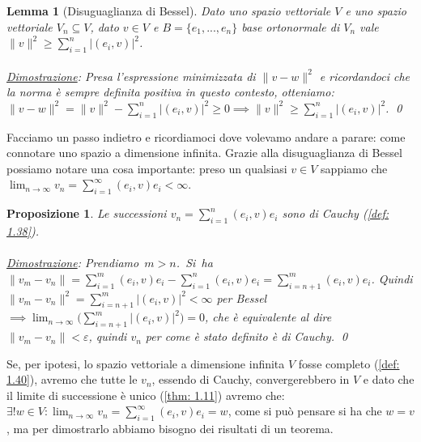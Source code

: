 \documentclass[a4paper,12pt]{report}
\newtheorem{proposizione}{Proposizione}[chapter]
\newtheorem{lemma}{Lemma}[chapter]
\newcommand{\lt}{<}
\newcommand{\gt}{>}
\begin{document}
\begin{lemma}[Disuguaglianza di Bessel]\label{lem: 2.2}
    Dato uno spazio vettoriale $V$ e uno spazio vettoriale $V_n \subseteq V$, dato $v\in V$ e $B=\{e_1,...,e_n\}$ base ortonormale di $V_n$ vale 
    \\$\|v\|^2\geq\displaystyle\sum_{i=1}^n|(e_i,v)|^2$.
    \\
    \\ \underline{Dimostrazione}: Presa l'espressione minimizzata di $\|v-w\|^2$ e ricordandoci che la norma è sempre definita positiva in questo contesto, otteniamo:
    \\$\|v-w\|^2=\|v\|^2-\displaystyle\sum_{i=1}^n|(e_i,v)|^2 \geq0 \implies \|v\|^2\geq\displaystyle\sum_{i=1}^n|(e_i,v)|^2$. \qed
\end{lemma}

Facciamo un passo indietro e ricordiamoci dove volevamo andare a parare: come connotare uno spazio a dimensione infinita. Grazie alla disuguaglianza di Bessel possiamo notare una cosa importante: preso un qualsiasi $v \in V$ sappiamo che $\displaystyle\lim_{n \to \infty}v_n=\sum_{i=1}^{\infty}(e_i,v)e_i \lt \infty$. 

\vspace{0.3cm}

\begin{proposizione}
    Le successioni $v_n=\displaystyle\sum_{i=1}^n(e_i,v)e_i$ sono di Cauchy (\ref{def: 1.38}).
    \\
    \\ \underline{Dimostrazione}: \mbox{Prendiamo $m \gt n$. Si ha $\|v_m-v_n\|=\displaystyle\sum_{i=1}^m(e_i,v)e_i-\sum_{i=1}^n(e_i,v)e_i=\sum_{i=n+1}^m(e_i,v)e_i$}.
    Quindi $\|v_m-v_n\|^2=\displaystyle\sum_{i=n+1}^m|(e_i,v)|^2 \lt \infty$ per Bessel $\implies \displaystyle\lim_{n \to \infty}\bigg(\sum_{i=n+1}^m|(e_i,v)|^2\bigg)=0$, che è equivalente al dire $\|v_m-v_n\| \lt \varepsilon$, quindi $v_n$ per come è stato definito è di Cauchy. \qed
\end{proposizione}

\vspace{0.5cm}

Se, per ipotesi, lo spazio vettoriale a dimensione infinita $V$ fosse completo (\ref{def: 1.40}), avremo che tutte le $v_n$, essendo di Cauchy, convergerebbero in $V$ e dato che il limite di successione è unico (\ref{thm: 1.11}) avremo che:
\\ $\exists !w \in V: \displaystyle\lim_{n \to \infty}v_n=\sum_{i=1}^{\infty}(e_i,v)e_i=w$, come si può pensare si ha che $w=v$, ma per dimostrarlo abbiamo bisogno dei risultati di un teorema.
\end{document}
